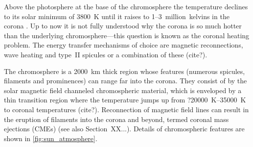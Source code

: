Above the photosphere at the base of the chromosphere the temperature declines to its solar minimum of \SI{3800}{\K} until it raises to \numrange{1}{3}~million~kelvins in the corona \citep{Billings1959}. Up to now it is not fully understood why the corona is so much hotter than the underlying chromosphere---this question is known as the coronal heating problem. The energy transfer mechanisms of choice are magnetic reconnections, wave heating and type~II spicules or a combination of these (cite?).

The chromosphere is a \SI{2000}{\km} thick region whose features (numerous spicules, filaments and prominences) can range far into the corona. They consist of by the solar magnetic field channeled chromospheric material, which is enveloped by a thin transition region where the temperature jumps up from ?\SIrange{20000}{35000}{\K} to coronal temperatures (cite?). Reconnection of magnetic field lines can result in the eruption of filaments into the corona and beyond, termed coronal mass ejections (CMEs) (see also Section~XX...). Details of chromospheric features are shown in \autoref{fig:sun_atmosphere}.

